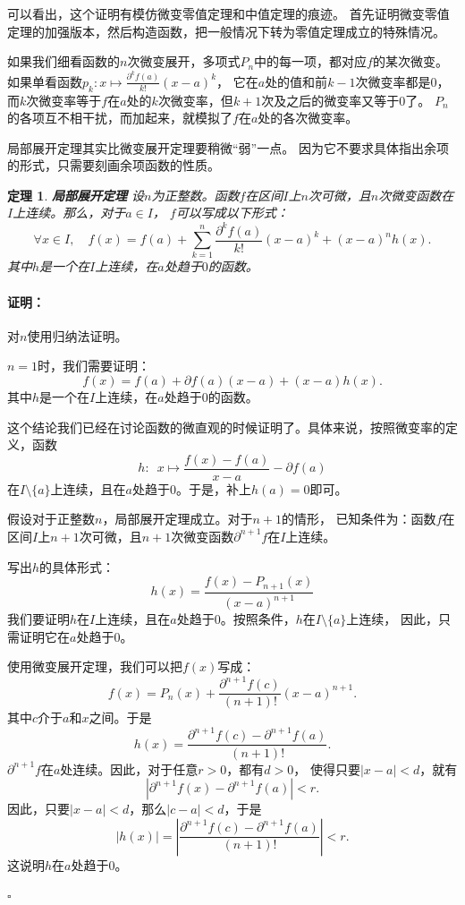 \documentclass[12pt,UTF8]{ctexbook}
\renewenvironment{proof}{\paragraph{\textbf{证明：}}}{\hfill$\square$}
\newtheorem{tm}{定理}[section]
\begin{document}
\begin{appendix}
可以看出，这个证明有模仿微变零值定理和中值定理的痕迹。
首先证明微变零值定理的加强版本，然后构造函数，把一般情况下转为零值定理成立的特殊情况。

如果我们细看函数的$n$次微变展开，多项式$P_n$中的每一项，都对应$f$的某次微变。
如果单看函数$p_k: x\mapsto \frac{\partial^k f (a)}{k!}(x - a)^k$，
它在$a$处的值和前$k-1$次微变率都是$0$，而$k$次微变率等于$f$在$a$处的$k$次微变率，但$k+1$次及之后的微变率又等于$0$了。
$P_n$的各项互不相干扰，而加起来，就模拟了$f$在$a$处的各次微变率。

局部展开定理其实比微变展开定理要稍微“弱”一点。
因为它不要求具体指出余项的形式，只需要刻画余项函数的性质。

\begin{tm}{\textbf{局部展开定理}}
    设$n$为正整数。函数$f$在区间$I$上$n$次可微，且$n$次微变函数在$I$上连续。那么，对于$a\in I$，
    $f$可以写成以下形式：
    $$ \forall x \in I , \quad f(x) = f(a) + \sum_{k=1}^n \frac{\partial^k f (a)}{k!}(x - a)^k + (x - a)^n h(x). $$
    其中$h$是一个在$I$上连续，在$a$处趋于$0$的函数。
\end{tm}

\begin{proof}
    对$n$使用归纳法证明。

    $n=1$时，我们需要证明：
    $$ f(x) = f(a) + \partial f(a) (x - a) + (x - a) h(x). $$
    其中$h$是一个在$I$上连续，在$a$处趋于$0$的函数。
    
    这个结论我们已经在讨论函数的微直观的时候证明了。具体来说，按照微变率的定义，函数
    $$ h : \,\,\, x \mapsto \frac{f(x) - f(a)}{x - a} - \partial f(a) $$
    在$I\setminus\{a\}$上连续，且在$a$处趋于$0$。于是，补上$h(a) = 0$即可。

    假设对于正整数$n$，局部展开定理成立。对于$n+1$的情形，
    已知条件为：函数$f$在区间$I$上$n+1$次可微，且$n+1$次微变函数$\partial^{n+1} f$在$I$上连续。
    
    写出$h$的具体形式：
    $$ h(x) = \frac{f(x) - P_{n+1}(x)}{(x - a)^{n+1}} $$
    我们要证明$h$在$I$上连续，且在$a$处趋于$0$。按照条件，$h$在$I\setminus\{a\}$上连续，
    因此，只需证明它在$a$处趋于$0$。

    使用微变展开定理，我们可以把$f(x)$写成：
    $$ f(x) = P_n(x) + \frac{\partial^{n+1} f(c)}{(n + 1)!}(x - a)^{n+1}. $$
    其中$c$介于$a$和$x$之间。于是
    $$ h(x) = \frac{\partial^{n+1} f(c) - \partial^{n+1} f(a)}{(n + 1)!}. $$
    $\partial^{n+1} f$在$a$处连续。因此，对于任意$r>0$，都有$d > 0$，
    使得只要$|x - a| < d$，就有
    $$ \left| \partial^{n+1} f(x) - \partial^{n+1} f(a) \right| < r. $$
    因此，只要$|x - a| < d$，那么$|c - a| < d$，于是
    $$ |h(x)| = \left| \frac{\partial^{n+1} f(c) - \partial^{n+1} f(a)}{(n + 1)!} \right| < r .$$
    这说明$h$在$a$处趋于$0$。


\end{proof}
\end{appendix}
\end{document}
